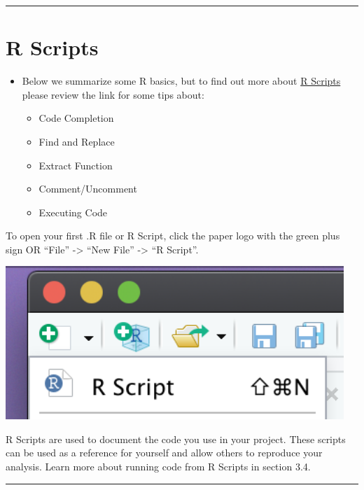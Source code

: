 \documentclass[
]{book}
\begin{document}
\begin{center}\rule{0.5\linewidth}{0.5pt}\end{center}

\hypertarget{r-scripts}{%
\section{R Scripts}\label{r-scripts}}

\begin{itemize}
\item
  Below we summarize some R basics, but to find out more about \href{https://support.rstudio.com/hc/en-us/articles/200484448-Editing-and-Executing-Code}{R Scripts} please review the link for some tips about:

  \begin{itemize}
  \item
    Code Completion
  \item
    Find and Replace
  \item
    Extract Function
  \item
    Comment/Uncomment
  \item
    Executing Code
  \end{itemize}
\end{itemize}

To open your first .R file or R Script, click the paper logo with the green plus sign OR ``File'' -\textgreater{} ``New File'' -\textgreater{} ``R Script''.

\begin{center}\includegraphics[width=5.03in]{img/Rscript} \end{center}

R Scripts are used to document the code you use in your project. These scripts can be used as a reference for yourself and allow others to reproduce your analysis. Learn more about running code from R Scripts in section 3.4.

\begin{center}\rule{0.5\linewidth}{0.5pt}\end{center}
\end{document}
